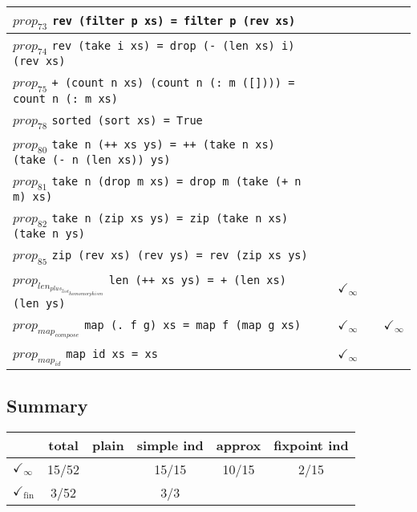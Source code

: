 \documentclass{article}
\begin{document}
\begin{longtable}{p{10cm} || c | c | c | c | }
\hline
$prop_{73}$ \newline \verb`rev (filter p xs) = filter p (rev xs)` &  &  &  &  \\
\hline
$prop_{74}$ \newline \verb`rev (take i xs) = drop (- (len xs) i) (rev xs)` &  &  &  &  \\
\hline
$prop_{75}$ \newline \verb`+ (count n xs) (count n (: m ([]))) = count n (: m xs)` &  &  &  &  \\
\hline
$prop_{78}$ \newline \verb`sorted (sort xs) = True` &  &  &  &  \\
\hline
$prop_{80}$ \newline \verb`take n (++ xs ys) = ++ (take n xs) (take (- n (len xs)) ys)` &  &  &  &  \\
\hline
$prop_{81}$ \newline \verb`take n (drop m xs) = drop m (take (+ n m) xs)` &  &  &  &  \\
\hline
$prop_{82}$ \newline \verb`take n (zip xs ys) = zip (take n xs) (take n ys)` &  &  &  &  \\
\hline
$prop_{85}$ \newline \verb`zip (rev xs) (rev ys) = rev (zip xs ys)` &  &  &  &  \\
\hline
$prop_{len_{plus_{list_{homomorphism}}}}$ \newline \verb`len (++ xs ys) = + (len xs) (len ys)` &  & $\checkmark_{\infty}$ &  &  \\
\hline
$prop_{map_{compose}}$ \newline \verb`map (. f g) xs = map f (map g xs)` &  & $\checkmark_{\infty}$ &  & $\checkmark_{\infty}$ \\
\hline
$prop_{map_{id}}$ \newline \verb`map id xs = xs` &  & $\checkmark_{\infty}$ &  &  \\
\end{longtable}

\subsection*{Summary}
\begin{longtable}{p{4cm} || c | c | c | c | c | }
  & total & plain & simple ind & approx & fixpoint ind \\
\hline
$\checkmark_{\infty}$ & 15/52 &  & 15/15 & 10/15 & 2/15\\
\hline
$\checkmark_{\mathrm{fin}}$ & 3/52 &  & 3/3 &  & \\
\end{longtable}
\end{document}
